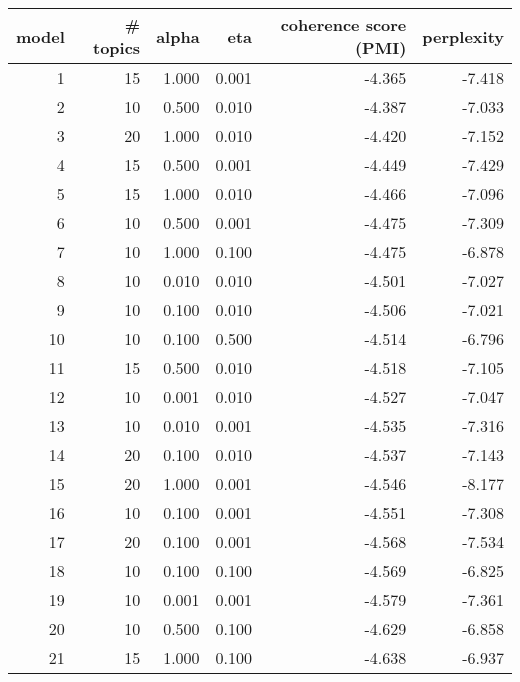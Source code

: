 \begin{tabular}{rrrrrr}
\toprule
 model &  \# topics &  alpha &   eta &  coherence score (PMI) &  perplexity \\
\midrule
     1 &        15 &  1.000 & 0.001 &                 -4.365 &      -7.418 \\
     2 &        10 &  0.500 & 0.010 &                 -4.387 &      -7.033 \\
     3 &        20 &  1.000 & 0.010 &                 -4.420 &      -7.152 \\
     4 &        15 &  0.500 & 0.001 &                 -4.449 &      -7.429 \\
     5 &        15 &  1.000 & 0.010 &                 -4.466 &      -7.096 \\
     6 &        10 &  0.500 & 0.001 &                 -4.475 &      -7.309 \\
     7 &        10 &  1.000 & 0.100 &                 -4.475 &      -6.878 \\
     8 &        10 &  0.010 & 0.010 &                 -4.501 &      -7.027 \\
     9 &        10 &  0.100 & 0.010 &                 -4.506 &      -7.021 \\
    10 &        10 &  0.100 & 0.500 &                 -4.514 &      -6.796 \\
    11 &        15 &  0.500 & 0.010 &                 -4.518 &      -7.105 \\
    12 &        10 &  0.001 & 0.010 &                 -4.527 &      -7.047 \\
    13 &        10 &  0.010 & 0.001 &                 -4.535 &      -7.316 \\
    14 &        20 &  0.100 & 0.010 &                 -4.537 &      -7.143 \\
    15 &        20 &  1.000 & 0.001 &                 -4.546 &      -8.177 \\
    16 &        10 &  0.100 & 0.001 &                 -4.551 &      -7.308 \\
    17 &        20 &  0.100 & 0.001 &                 -4.568 &      -7.534 \\
    18 &        10 &  0.100 & 0.100 &                 -4.569 &      -6.825 \\
    19 &        10 &  0.001 & 0.001 &                 -4.579 &      -7.361 \\
    20 &        10 &  0.500 & 0.100 &                 -4.629 &      -6.858 \\
    21 &        15 &  1.000 & 0.100 &                 -4.638 &      -6.937 \\

\end{tabular}
